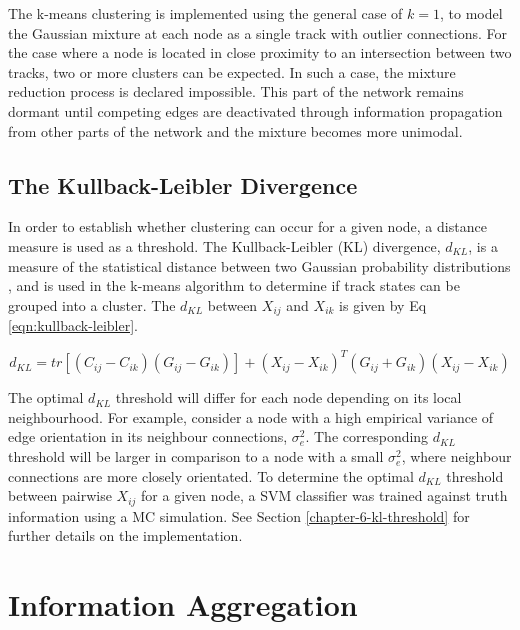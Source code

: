 The k-means clustering is implemented using the general case of $k=1$, to model the Gaussian mixture at each node as a single track with outlier connections. For the case where a node is located in close proximity to an intersection between two tracks, two or more clusters can be expected. In such a case, the mixture reduction process is declared impossible. This part of the network remains dormant until competing edges are deactivated through information propagation from other parts of the network and the mixture becomes more unimodal. 


\subsection{The Kullback-Leibler Divergence}
In order to establish whether clustering can occur for a given node, a distance measure is used as a threshold. The Kullback-Leibler (KL) divergence, $d_{KL}$, is a measure of the statistical distance between two Gaussian probability distributions \cite{KL, FRUHWIRTH19971}, and is used in the k-means algorithm to determine if track states can be grouped into a cluster. The $d_{KL}$ between $X_{ij}$ and $X_{ik}$ is given by Eq \eqref{eqn:kullback-leibler}.

\begin{equation}
    d_{KL} = tr[(C_{ij} - C_{ik})(G_{ij} - G_{ik})] + (X_{ij} - X_{ik})^{T}(G_{ij} + G_{ik})(X_{ij} - X_{ik})
    \label{eqn:kullback-leibler}
\end{equation}

The optimal $d_{KL}$ threshold will differ for each node depending on its local neighbourhood. For example, consider a node with a high empirical variance of edge orientation in its neighbour connections, $\sigma_{e}^{2}$. The corresponding $d_{KL}$ threshold will be larger in comparison to a node with a small $\sigma_{e}^{2}$, where neighbour connections are more closely orientated. To determine the optimal $d_{KL}$ threshold between pairwise $X_{ij}$ for a given node, a SVM classifier was trained against truth information using a MC simulation. See Section \ref{chapter-6-kl-threshold} for further details on the implementation.





\section{Information Aggregation}

